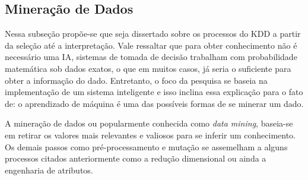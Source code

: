 \subsection{Mineração de Dados}
Nessa subseção propõe-se que seja dissertado sobre os processos do KDD a partir da seleção até a interpretação. Vale ressaltar que para obter conhecimento não é necessário uma IA, sistemas de tomada de decisão trabalham com probabilidade matemática sob dados exatos, o que em muitos casos, já seria o suficiente para obter a informação do dado. Entretanto, o foco da pesquisa se baseia na implementação de um sistema inteligente e isso inclina essa explicação para o fato de: o aprendizado de máquina é uma das possíveis formas de se minerar um dado.

A mineração de dados ou popularmente conhecida como \textit{data mining}, baseia-se em retirar os valores mais relevantes e valiosos para se inferir um conhecimento. Os demais passos como pré-processamento e mutação se assemelham a alguns processos citados anteriormente como a redução dimensional ou ainda a engenharia de atributos.

